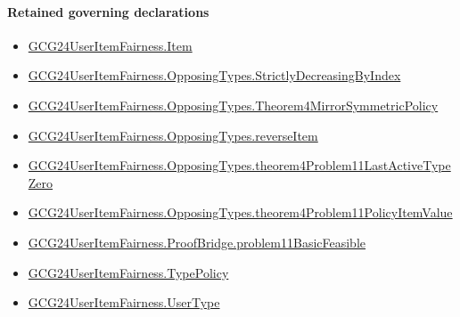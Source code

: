 \documentclass[10pt]{article}
\begin{document}
\paragraph{Retained governing declarations}
\begin{itemize}\raggedright
\item \hyperlink{governing-declaration-a7c560a429c6e204}{GCG24\allowbreak{}User\allowbreak{}Item\allowbreak{}Fairness.\allowbreak{}Item}
\item \hyperlink{governing-declaration-8278344d2ddef9a8}{GCG24\allowbreak{}User\allowbreak{}Item\allowbreak{}Fairness.\allowbreak{}Opposing\allowbreak{}Types.\allowbreak{}Strictly\allowbreak{}Decreasing\allowbreak{}By\allowbreak{}Index}
\item \hyperlink{governing-declaration-00d15cf288402d6b}{GCG24\allowbreak{}User\allowbreak{}Item\allowbreak{}Fairness.\allowbreak{}Opposing\allowbreak{}Types.\allowbreak{}Theorem4\allowbreak{}Mirror\allowbreak{}Symmetric\allowbreak{}Policy}
\item \hyperlink{governing-declaration-c12a8e29d370ae70}{GCG24\allowbreak{}User\allowbreak{}Item\allowbreak{}Fairness.\allowbreak{}Opposing\allowbreak{}Types.\allowbreak{}reverse\allowbreak{}Item}
\item \hyperlink{governing-declaration-4079ef2267e358f9}{GCG24\allowbreak{}User\allowbreak{}Item\allowbreak{}Fairness.\allowbreak{}Opposing\allowbreak{}Types.\allowbreak{}theorem4\allowbreak{}Problem11\allowbreak{}Last\allowbreak{}Active\allowbreak{}Type\allowbreak{}Zero}
\item \hyperlink{governing-declaration-9dd6ffc03d249aa8}{GCG24\allowbreak{}User\allowbreak{}Item\allowbreak{}Fairness.\allowbreak{}Opposing\allowbreak{}Types.\allowbreak{}theorem4\allowbreak{}Problem11\allowbreak{}Policy\allowbreak{}Item\allowbreak{}Value}
\item \hyperlink{paper-prerequisite-2cefb4a6370a37cb}{GCG24\allowbreak{}User\allowbreak{}Item\allowbreak{}Fairness.\allowbreak{}Proof\allowbreak{}Bridge.\allowbreak{}problem11\allowbreak{}Basic\allowbreak{}Feasible}
\item \hyperlink{governing-declaration-dc7776cb642fa9dc}{GCG24\allowbreak{}User\allowbreak{}Item\allowbreak{}Fairness.\allowbreak{}Type\allowbreak{}Policy}
\item \hyperlink{governing-declaration-fd2c25ccc96ab645}{GCG24\allowbreak{}User\allowbreak{}Item\allowbreak{}Fairness.\allowbreak{}User\allowbreak{}Type}
\end{itemize}
\end{document}
